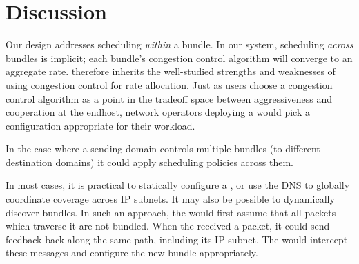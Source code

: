 \section{Discussion}\label{s:discussion}

 Our \name design addresses scheduling \emph{within} a bundle. In our system, scheduling \emph{across} bundles is implicit; each bundle's congestion control algorithm will converge to an aggregate rate. 
\name therefore inherits the well-studied strengths and weaknesses of using congestion control for rate allocation. 
Just as users choose a congestion control algorithm as a point in the tradeoff space between aggressiveness and cooperation at the endhost, network operators deploying a \name would pick a configuration appropriate for their workload.

In the case where a sending domain controls multiple bundles (to different destination domains) it could apply scheduling policies across them.
 
\label{s:impl:discovery}
In most cases, it is practical to statically configure a \pair, or use the DNS to globally coordinate \name coverage across IP subnets.
It may also be possible to dynamically discover bundles. 
In such an approach, the \inbox would first assume that all packets which traverse it are not bundled.
When the \outbox received a packet, it could send feedback back along the same path, including its IP subnet.
The \inbox would intercept these messages and configure the new bundle appropriately.



